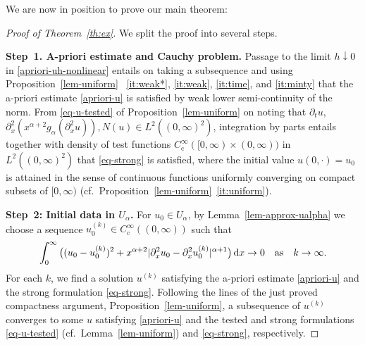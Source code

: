 \documentclass[reqno,12pt]{amsart}
\renewcommand{\d}{\ensuremath{\mathrm{d}}}
\renewcommand{\d}{\ensuremath{{\rm d}}}
\numberwithin{equation}{section}
\begin{document}
We are now in position to prove our main theorem:
%
\begin{proof}[Proof of Theorem~\ref{th:ex}] We split the proof into several steps.

%
\bigskip
%

%
\textbf{Step~1. A-priori estimate and Cauchy problem. }
%
Passage to the limit $h \downarrow 0$ in \eqref{apriori-uh-nonlinear} entails on taking a subsequence and using Proposition~\ref{lem-uniform}%
~\eqref{it:weak*}, \eqref{it:weak}, \eqref{it:time}, and \eqref{it:minty} that the a-priori estimate \eqref{apriori-u} is satisfied by weak lower semi-continuity of the norm. From \eqref{eq-u-tested} of Proposition~\ref{lem-uniform} on noting that $\partial_t u$, $\partial_x^2(x^{\alpha+2} g_\alpha(\partial_x^2 u)), N(u) \in L^2((0,\infty)^2)$, integration by parts entails together with density of test functions $C^\infty_\mathrm{c}([0,\infty) \times (0,\infty))$ in $L^2((0,\infty)^2)$ that \eqref{eq-strong} is satisfied, where the initial value $u(0,\cdot) = u_0$ is attained in the sense of continuous functions uniformly converging on compact subsets of $[0,\infty)$ (cf.~Proposition~\ref{lem-uniform}~\eqref{it:uniform}).

%
\bigskip
%

%
\textbf{Step~2: Initial data in $U_\alpha$. }
%
For $u_0 \in U_\alpha$, by Lemma~\ref{lem-approx-ualpha} we choose a sequence $u_0^{(k)} \in C^\infty_\mathrm{c}((0,\infty))$ such that
%
\[
\int_0^\infty \big((u_0 - u_0^{(k)})^2 + x^{\alpha+2} |\partial_x^2 u_0 - \partial_x^2 u_0^{(k)}|^{\alpha+1}\big) \, \d x \to 0 \quad \text{as} \quad k \to \infty.
\]
%
For each $k$, we find a solution $u^{(k)}$ satisfying the a-priori estimate \eqref{apriori-u} and the strong formulation \eqref{eq-strong}. Following the lines of the just proved compactness argument, Proposition~\ref{lem-uniform}, a subsequence of $u^{(k)}$ converges to some $u$ satisfying \eqref{apriori-u} and the tested and strong formulations \eqref{eq-u-tested} (cf.~Lemma~\ref{lem-uniform}) and \eqref{eq-strong}, respectively.

%
\bigskip
%


\end{proof}
\end{document}
